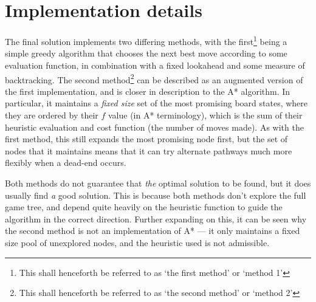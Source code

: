 \documentclass[a4paper, 11pt, titlepage]{report}
\begin{document}
\chapter{Implementation details}
The final solution implements two differing methods, with the first\footnote{This shall henceforth be referred to as `the first method' or `method 1'} being a simple greedy algorithm that chooses the next best move according to some evaluation function, in combination with a fixed lookahead and some measure of backtracking. The second method\footnote{This shall henceforth be referred to as `the second method' or `method 2'} can be described as an augmented version of the first implementation, and is closer in description to the A* algorithm. In particular, it maintains a \emph{fixed size} set of the most promising board states, where they are ordered by their $f$ value (in A* terminology), which is the sum of their heuristic evaluation and cost function (the number of moves made). As with the first method, this still expands the most promising node first, but the set of nodes that it maintains means that it can try alternate pathways much more flexibly when a dead-end occurs.

Both methods do not guarantee that \emph{the} optimal solution to be found, but it does usually find \emph{a} good solution. This is because both methods don't explore the full game tree, and depend quite heavily on the heuristic function to guide the algorithm in the correct direction. Further expanding on this, it can be seen why the second method is not an implementation of A* --- it only maintains a fixed size pool of unexplored nodes, and the heuristic used is not admissible.
\end{document}
